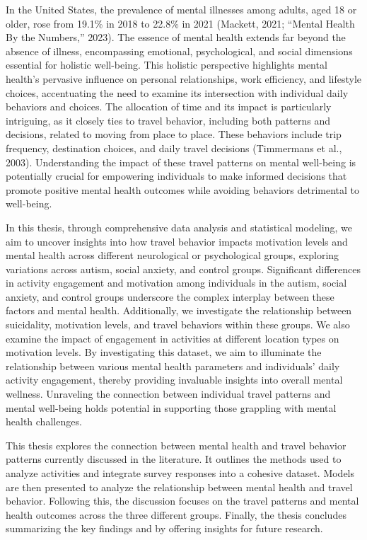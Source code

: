\documentclass[
  letterpaper,
  number,
  review,
  3p]{elsarticle}
\begin{document}
In the United States, the prevalence of mental illnesses among adults,
aged 18 or older, rose from 19.1\% in 2018 to 22.8\% in 2021 (Mackett,
2021; {``Mental {Health By} the {Numbers},''} 2023). The essence of
mental health extends far beyond the absence of illness, encompassing
emotional, psychological, and social dimensions essential for holistic
well-being. This holistic perspective highlights mental health's
pervasive influence on personal relationships, work efficiency, and
lifestyle choices, accentuating the need to examine its intersection
with individual daily behaviors and choices. The allocation of time and
its impact is particularly intriguing, as it closely ties to travel
behavior, including both patterns and decisions, related to moving from
place to place. These behaviors include trip frequency, destination
choices, and daily travel decisions (Timmermans et al., 2003).
Understanding the impact of these travel patterns on mental well-being
is potentially crucial for empowering individuals to make informed
decisions that promote positive mental health outcomes while avoiding
behaviors detrimental to well-being.

In this thesis, through comprehensive data analysis and statistical
modeling, we aim to uncover insights into how travel behavior impacts
motivation levels and mental health across different neurological or
psychological groups, exploring variations across autism, social
anxiety, and control groups. Significant differences in activity
engagement and motivation among individuals in the autism, social
anxiety, and control groups underscore the complex interplay between
these factors and mental health. Additionally, we investigate the
relationship between suicidality, motivation levels, and travel
behaviors within these groups. We also examine the impact of engagement
in activities at different location types on motivation levels. By
investigating this dataset, we aim to illuminate the relationship
between various mental health parameters and individuals' daily activity
engagement, thereby providing invaluable insights into overall mental
wellness. Unraveling the connection between individual travel patterns
and mental well-being holds potential in supporting those grappling with
mental health challenges.

This thesis explores the connection between mental health and travel
behavior patterns currently discussed in the literature. It outlines the
methods used to analyze activities and integrate survey responses into a
cohesive dataset. Models are then presented to analyze the relationship
between mental health and travel behavior. Following this, the
discussion focuses on the travel patterns and mental health outcomes
across the three different groups. Finally, the thesis concludes
summarizing the key findings and by offering insights for future
research.
\end{document}
